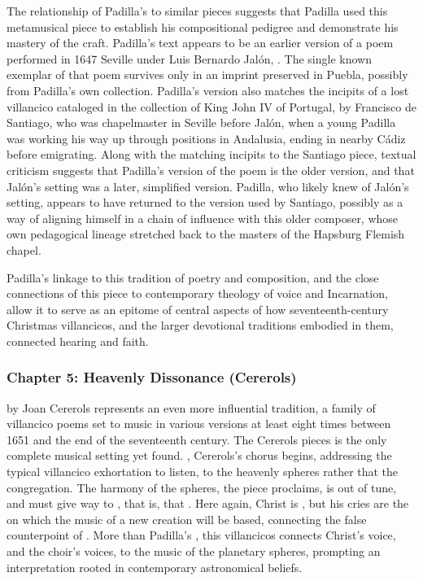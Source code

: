 \documentclass[tt]{vcbook-proposal}
\begin{document}
The relationship of Padilla's  to similar pieces suggests that Padilla used this metamusical piece to establish his compositional pedigree and demonstrate his mastery of the craft.
Padilla's text appears to be an earlier version of a poem performed in 1647 Seville under Luis Bernardo Jalón, .
The single known exemplar of that poem survives only in an imprint preserved in Puebla, possibly from Padilla's own collection.
Padilla's version also matches the incipits of a lost villancico cataloged in the collection of King John IV of Portugal, by Francisco de Santiago, who was chapelmaster in Seville before Jalón, when a young Padilla was working his way up through positions in Andalusia, ending in nearby Cádiz before emigrating.
Along with the matching incipits to the Santiago piece, textual criticism suggests that Padilla's version of the poem is the older version, and that Jalón's setting was a later, simplified version.
Padilla, who likely knew of Jalón's setting, appears to have returned to the version used by Santiago, possibly as a way of aligning himself in a chain of influence with this older composer, whose own pedagogical lineage stretched back to the masters of the Hapsburg Flemish chapel.

Padilla's linkage to this tradition of poetry and composition, and the close connections of this piece to contemporary theology of voice and Incarnation, allow it to serve as an epitome of central aspects of how seventeenth-century Christmas villancicos, and the larger devotional traditions embodied in them, connected hearing and faith.



\subsubsection{Chapter 5: Heavenly Dissonance (Cererols)}

 by Joan Cererols represents an even more influential tradition, a family of villancico poems set to music in various versions at least eight times between 1651 and the end of the seventeenth century.
The Cererols pieces is the only complete musical setting yet found.
, Cererols's chorus begins, addressing the typical villancico exhortation to listen, to the heavenly spheres rather that the congregation. 
The harmony of the spheres, the piece proclaims, is out of tune, and must give way to , that is,  that .
Here again, Christ is , but his cries are the  on which the music of a new creation will be based, connecting the false counterpoint of .
More than Padilla's , this villancicos connects Christ's voice, and the choir's voices, to the music of the planetary spheres, prompting an interpretation rooted in contemporary astronomical beliefs.
\end{document}
